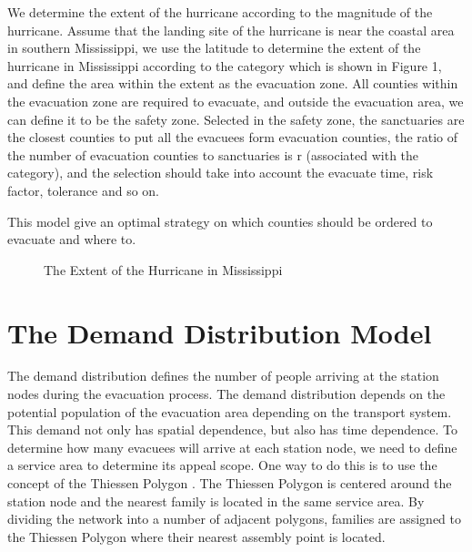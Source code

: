 \documentclass{mcmthesis}
\begin{document}
We determine the extent of the hurricane according to the magnitude of the hurricane. Assume that the landing site of the hurricane is near the coastal area in southern Mississippi, we use the latitude to determine the extent of the hurricane in Mississippi according to the category which is shown in Figure 1, and define the area within the extent as the evacuation zone. All counties within the evacuation zone are required to evacuate, and outside the evacuation area, we can define it to be the safety zone. Selected in the safety zone, the sanctuaries are the closest counties to put all the evacuees form evacuation counties, the ratio of the number of evacuation counties to sanctuaries is r (associated with the category), and the selection should take into account the evacuate time, risk factor, tolerance and so on.

This model give an optimal strategy on which counties should be ordered to evacuate and where to.

\begin{figure}[!htbp]
  \caption{The Extent of the Hurricane in Mississippi}\label{figure1}
\end{figure}

\section{The Demand Distribution Model}

The demand distribution defines the number of people arriving at the station nodes during the evacuation process. The demand distribution depends on the potential population of the evacuation area depending on the transport system. This demand not only has spatial dependence, but also has time dependence. To determine how many evacuees will arrive at each station node, we need to define a service area to determine its appeal scope. One way to do this is to use the concept of the Thiessen Polygon \cite{Bretschneider2011A}. The Thiessen Polygon is centered around the station node and the nearest family is located in the same service area. By dividing the network into a number of adjacent polygons, families are assigned to the Thiessen Polygon where their nearest assembly point is located.
\end{document}
